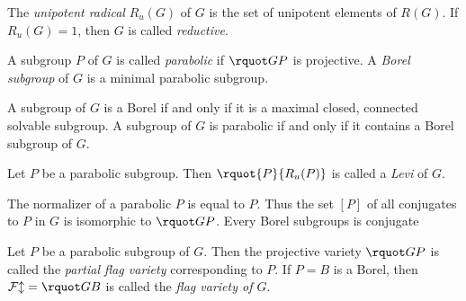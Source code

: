 \documentclass[english, no-theorem-numbers]{short-notes}
\begin{document}
\begin{Def}
    The \emph{unipotent radical} $R_u(G)$ of $G$ is the set of unipotent elements of $R(G)$.
    If $R_u(G) = 1$, then $G$ is called \emph{reductive}.
\end{Def}

\begin{Def}
    A subgroup $P$ of $G$ is called \emph{parabolic} if $\rquot GP$ is projective.
    A \emph{Borel subgroup} of $G$ is a minimal parabolic subgroup.
\end{Def}

\begin{Prop}
    A subgroup of $G$ is a Borel if and only if it is a maximal closed, connected solvable subgroup.
    A subgroup of $G$ is parabolic if and only if it contains a Borel subgroup of $G$.
\end{Prop}

\begin{Def}
    Let $P$ be a parabolic subgroup.
    Then $\rquot{P}{R_u(P)}$ is called a \emph{Levi} of $G$.
\end{Def}

The normalizer of a parabolic $P$ is equal to $P$. 
Thus the set $[P]$ of all conjugates to $P$ in $G$ is isomorphic to $\rquot GP$.
Every Borel subgroups is conjugate

\begin{Def}
    Let $P$ be a parabolic subgroup of $G$.
    Then the projective variety $\rquot GP$ is called the \emph{partial flag variety} corresponding to $P$.
    If $P = B$ is a Borel, then $\mathcal{Fl} = \rquot GB$ is called the \emph{flag variety of $G$}.
\end{Def}

\end{document}
